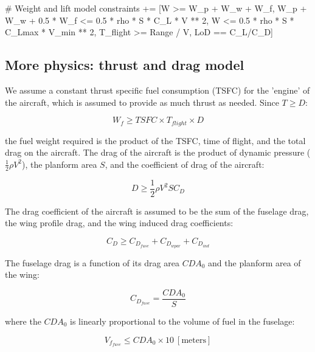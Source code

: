 \begin{python}
        # Weight and lift model
        constraints += [W >= W_p + W_w + W_f,
                W_p + W_w + 0.5 * W_f <=
                        0.5 * rho * S * C_L * V ** 2,
                W <= 0.5 * rho * S * C_Lmax * V_min ** 2,
                T_flight >= Range / V,
                LoD == C_L/C_D]
\end{python}

\subsection{More physics: thrust and drag model}

We assume a constant thrust specific fuel consumption (TSFC) for the 'engine' of the aircraft, which is assumed to provide as much thrust as needed. Since $T \geq D$:

\begin{equation}
    W_f \geq TSFC \times T_{flight} \times D
\end{equation}

the fuel weight required is the product of the TSFC, time of flight, and the total drag on the aircraft. The drag of the aircraft is the product of dynamic pressure ($\frac{1}{2} \rho V^2$), the planform area $S$, and the coefficient of drag of the aircraft:

\begin{equation} 
    D \geq \frac{1}{2}  \rho V^2 S  C_D
\label{e:d}
\end{equation}

The drag coefficient of the aircraft is assumed to be the sum of the fuselage drag, the wing profile drag, and the wing induced drag coefficients: 

\begin{equation}
    C_D \geq C_{D_{fuse}} + C_{D_{wpar}} + C_{D_{ind}}
\label{e:cd}
\end{equation}

The fuselage drag is a function of its drag area $CDA_0$ and the planform area of the wing:

\begin{equation}
    C_{D_{fuse}} = \frac{CDA_0}{S}
\label{e:cdfuse}
\end{equation}

where the $CDA_0$ is linearly proportional to the volume of fuel in the fuselage:

\begin{equation}
    V_{f_{fuse}} \leq CDA_0 \times 10 ~\mathrm{[meters]}
\label{e:vffuse}
\end{equation}

